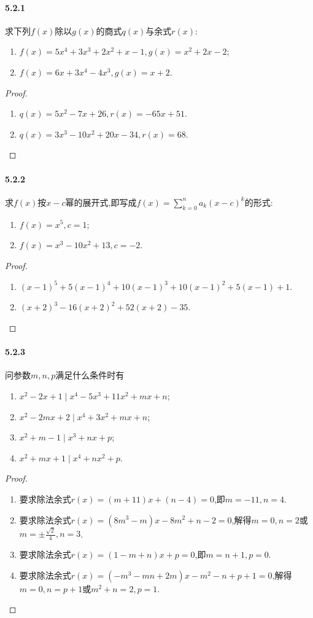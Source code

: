 \documentclass[11pt]{article}
\begin{document}
\paragraph{5.2.1}求下列$f(x)$除以$g(x)$的商式$q(x)$与余式$r(x)$:
\begin{enumerate}
    \item $f(x)=5x^4+3x^3+2x^2+x-1, g(x)=x^2+2x-2$;
    \item $f(x)=6x+3x^4-4x^3, g(x)=x+2$.
\end{enumerate}
\begin{proof}
    \begin{enumerate}
        \item $q(x)=5 x^2-7x+26, r(x)=-65x+51$.
        \item $q(x)=3 x^3-10  x^2+20  x-34, r(x)=68$.
    \end{enumerate}
\end{proof}
\paragraph{5.2.2}求$f(x)$按$x-c$幂的展开式,即写成$f(x)=\sum_{k=0}^n a_k (x-c)^k$的形式:
\begin{enumerate}
    \item $f(x)=x^5, c=1$;
    \item $f(x)=x^3-10x^2+13, c=-2$.
\end{enumerate}
\begin{proof}
    \begin{enumerate}
        \item $(x-1)^5+5(x-1)^4+10(x-1)^3+10(x-1)^2+5(x-1)+1$.
        \item $(x+2)^3-16(x+2)^2+52(x+2)-35$.
    \end{enumerate}
\end{proof}
\paragraph{5.2.3}问参数$m,n,p$满足什么条件时有
\begin{enumerate}
    \item $x^2-2x+1\mid x^4-5x^3+11x^2+mx+n$;
    \item $x^2-2mx+2\mid x^4+3x^2+mx+n$;
    \item $x^2+m-1\mid x^3+nx+p$;
    \item $x^2+mx+1\mid x^4+nx^2+p$.
\end{enumerate}
\begin{proof}
    \begin{enumerate}
        \item 要求除法余式$r(x)=(m+11)x+(n-4)=0$,即$m=-11, n=4$.
        \item 要求除法余式$r(x)=(8 m^3-m) x-8 m^2+n-2=0$,解得$m=0, n=2$或$m=\pm\frac{\sqrt{2}}{4}, n=3$.
        \item 要求除法余式$r(x)=(1-m+n)x+p=0$,即$m=n+1, p=0$.
        \item 要求除法余式$r(x)=(-m^3-m n+2 m)x -m^2-n+p+1=0$,解得$m=0, n=p+1$或$m^2+n=2, p=1$.
    \end{enumerate}
\end{proof}
\end{document}
